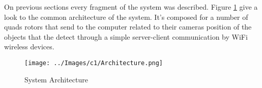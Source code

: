 On previous sections every fragment of the system was described. Figure \ref{fig:System_Architecture} give a look to the common architecture of the system. It's composed for a number of quads rotors that send to the computer related to their cameras position of the objects that the detect through a simple server-client communication by WiFi wireless devices.

\begin{figure}[hb]
	\centering
	\texttt{[image: ../Images/c1/Architecture.png]}
	\caption{System Architecture}
	\label{fig:System_Architecture}
\end{figure}
